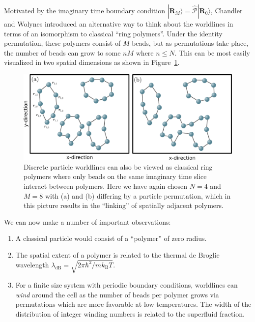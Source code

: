 \documentclass[prb,aps,amssym,nofootinbib,floatfix,notitlepage]{revtex4-1}
\renewcommand{\vec}[1]{\boldsymbol{#1}}
\newcommand{\R}{\vec{R}}
\begin{document}
Motivated by the imaginary time boundary condition $|\R_M\rangle =
\hat{\mathcal{P}}|\R_0\rangle$, Chandler and Wolynes \cite{Chandler:1981gz}
introduced an alternative way to think about the worldlines in terms of an
isomorphism to classical ``ring polymers''.  Under the identity permutation,
these polymers consist of $M$ beads, but as permutations take place, the number
of beads can grow to some $n M$ where $n \le N$. This can be most easily
visualized in two spatial dimensions as shown in Figure~\ref{fig:polymers}.
%
\begin{figure}
\begin{center}
\includegraphics[width=0.75\columnwidth]{Figures/polymers.pdf}
\end{center}
\caption{Discrete particle worldlines can also be viewed as classical ring
    polymers where only beads on the same imaginary time slice interact between
    polymers.  Here we have again chosen $N=4$ and $M=8$ with (a) and (b)
    differing by a particle permutation, which in this picture results in the
``linking'' of spatially adjacent polymers.}
\label{fig:polymers}
 \end{figure}
%
We can now make a number of important observations:
\begin{enumerate}
    \item A classical particle would consist of a ``polymer'' of zero radius.
    \item The spatial extent of a polymer is related to the thermal de Broglie
    wavelength $\lambda_{\mathrm{dB}} = \sqrt{2\pi \hbar^2 / m k_\mathrm{B} T
    }$.
\item For a finite size system with periodic boundary conditions, worldlines
    can \emph{wind} around the cell as the number of beads per polymer grows
    via permutations which are more favorable at low temperatures.  The width
    of the distribution of integer winding numbers is related to the superfluid
    fraction.
\end{enumerate}
\end{document}
